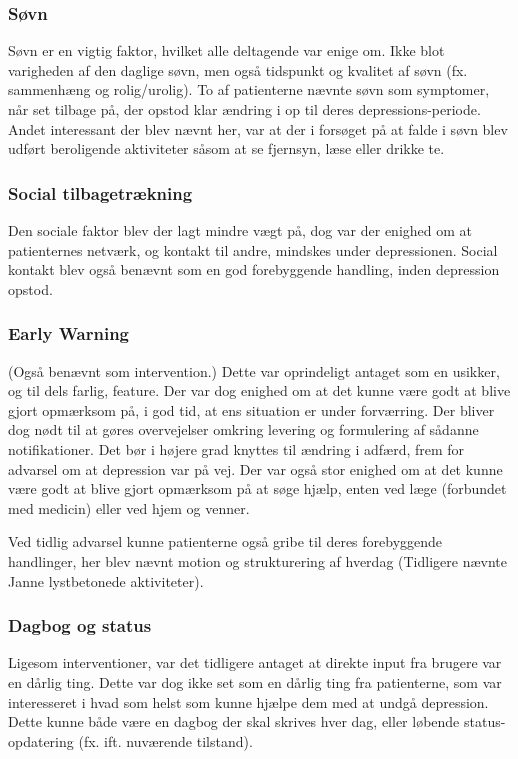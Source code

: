 \subsubsection{Søvn}
Søvn er en vigtig faktor, hvilket alle deltagende var enige om.
Ikke blot varigheden af den daglige søvn, men også tidspunkt og kvalitet af søvn (fx. sammenhæng og rolig/urolig).
To af patienterne nævnte søvn som symptomer, når set tilbage på, der opstod klar ændring i op til deres depressions-periode.
Andet interessant der blev nævnt her, var at der i forsøget på at falde i søvn blev udført beroligende aktiviteter såsom at se fjernsyn, læse eller drikke te.

\subsubsection{Social tilbagetrækning}
Den sociale faktor blev der lagt mindre vægt på, dog var der enighed om at patienternes netværk, og kontakt til andre, mindskes under depressionen.
Social kontakt blev også benævnt som en god forebyggende handling, inden depression opstod.

\subsubsection{Early Warning}
(Også benævnt som intervention.)
Dette var oprindeligt antaget som en usikker, og til dels farlig, feature.
Der var dog enighed om at det kunne være godt at blive gjort opmærksom på, i god tid, at ens situation er under forværring.
Der bliver dog nødt til at gøres overvejelser omkring levering og formulering af sådanne notifikationer.
Det bør i højere grad knyttes til ændring i adfærd, frem for advarsel om at depression var på vej.
Der var også stor enighed om at det kunne være godt at blive gjort opmærksom på at søge hjælp, enten ved læge (forbundet med medicin) eller ved hjem og venner.

Ved tidlig advarsel kunne patienterne også gribe til deres forebyggende handlinger, her blev nævnt motion og strukturering af hverdag 
(Tidligere nævnte Janne lystbetonede aktiviteter).

\subsubsection{Dagbog og status}
Ligesom interventioner, var det tidligere antaget at direkte input fra brugere var en dårlig ting.
Dette var dog ikke set som en dårlig ting fra patienterne, som var interesseret i hvad som helst som kunne hjælpe dem med at undgå depression.
Dette kunne både være en dagbog der skal skrives hver dag, eller løbende status-opdatering (fx. ift. nuværende tilstand).

